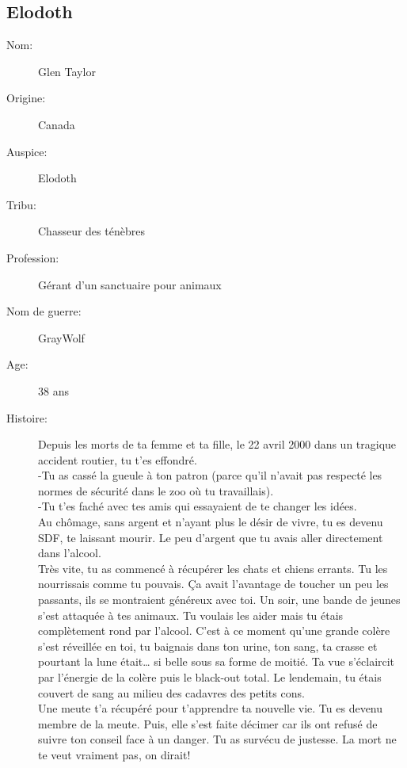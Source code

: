 \documentclass[oneside,12pt]{book}
\begin{document}
\begin{flushleft}
\section{Elodoth}
\begin{description}
\item[Nom:]{Glen Taylor}
\item[Origine:]{Canada}
\item[Auspice:]{Elodoth}
\item[Tribu:]{Chasseur des ténèbres}
\item[Profession:]{Gérant d'un sanctuaire pour animaux}
\item[Nom de guerre:]{GrayWolf}
\item[Age:]{38 ans}
\item[Histoire:]{
Depuis les morts de ta femme et ta fille, le 22 avril 2000 dans un tragique accident routier, tu t’es effondré.\\
-Tu as cassé la gueule à ton patron (parce qu’il n’avait pas respecté les normes de sécurité dans le zoo où tu travaillais). \\
-Tu t’es faché avec tes amis qui essayaient de te changer les idées.\\
Au chômage, sans argent et n’ayant plus le désir de vivre, tu es devenu SDF, te laissant mourir.
Le peu d’argent que tu avais aller directement dans l’alcool.\\ 
Très vite, tu as commencé à récupérer les chats et chiens errants. Tu les nourrissais comme tu pouvais. Ça avait l’avantage de toucher un peu les passants, ils se montraient généreux avec toi.
Un soir, une bande de jeunes s’est attaquée à tes animaux. Tu voulais les aider mais tu étais complètement rond par l’alcool. C'est à ce moment qu'une grande colère s’est réveillée en toi, tu baignais dans ton urine, ton sang, ta crasse et pourtant la lune était… si belle sous sa forme de moitié. Ta vue s’éclaircit par l'énergie de la colère puis le black-out total. Le lendemain, tu étais couvert de sang au milieu des cadavres des petits cons. \\
Une meute t’a récupéré pour t’apprendre ta nouvelle vie. Tu es devenu membre de la meute. Puis, elle s’est faite décimer car ils ont refusé de suivre ton conseil face à un danger. Tu as survécu de justesse. La mort ne te veut vraiment pas, on dirait!\\
}
\end{description}
\end{flushleft}
\end{document}
